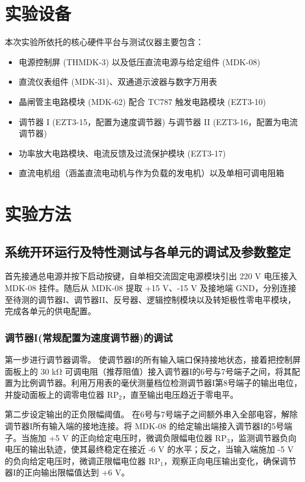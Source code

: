 \begin{framed}
{			\section{实验设备}
			本次实验所依托的核心硬件平台与测试仪器主要包含：
			\begin{itemize}
				\item 电源控制屏 (THMDK-3) 以及低压直流电源与给定组件 (MDK-08)
				\item 直流仪表组件 (MDK-31)、双通道示波器与数字万用表
				\item 晶闸管主电路模块 (MDK-62) 配合 TC787 触发电路模块 (EZT3-10)
				\item 调节器 I (EZT3-15，配置为速度调节器) 与调节器 II (EZT3-16，配置为电流调节器)
				\item 功率放大电路模块、电流反馈及过流保护模块 (EZT3-17)
				\item 直流电机组（涵盖直流电动机与作为负载的发电机）以及单相可调电阻箱
			\end{itemize}
			
			\section{实验方法}
			
			\subsection{系统开环运行及特性测试与各单元的调试及参数整定}
			首先接通总电源并按下启动按键，自单相交流固定电源模块引出 220 V 电压接入 MDK-08 挂件。随后从 MDK-08 提取 +15 V、-15 V 及接地端 GND，分别连接至待测的调节器I、调节器II、反号器、逻辑控制模块以及转矩极性零电平模块，完成各单元的供电配置。
			
			\subsubsection{调节器I(常规配置为速度调节器)的调试}
			第一步进行调节器调零。
			使调节器I的所有输入端口保持接地状态，接着把控制屏面板上的 30 kΩ 可调电阻（推荐阻值）接入调节器I的6号与7号端子之间，将其配置为比例调节器。利用万用表的毫伏测量档位检测调节器I第8号端子的输出电位，并旋动面板上的调零电位器 $\text{RP}_2$，直至输出电压趋近于零电平。
			
			第二步设定输出的正负限幅阈值。
			在6号与7号端子之间额外串入全部电容，解除调节器I所有输入端的接地连接。将 MDK-08 的给定输出端接入调节器I的5号端子。当施加 +5 V 的正向给定电压时，微调负限幅电位器 $\text{RP}_3$，监测调节器负向电压的输出轨迹，使其最终稳定在接近 -6 V 的水平；反之，当输入端施加 -5 V 的负向给定电压时，微调正限幅电位器 $\text{RP}_1$，观察正向电压输出变化，确保调节器I的正向输出限幅值达到 +6 V。
			
}
\end{framed}
